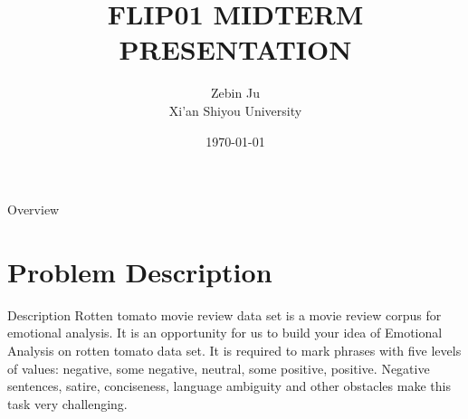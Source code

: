\documentclass[
 size=12pt,
 paper=smartboard, %
 mode=present, %
 display=slides, %
style=tuliplab,
pauseslide,
fleqn,leqno]{powerdot}
\title{FLIP01 MIDTERM PRESENTATION}
\author{
Zebin Ju
\\
Xi'an Shiyou University 
}
\date{\today}
\begin{document}
\maketitle 
\begin{slide}[toc=,bm=]{Overview}
  \tableofcontents[content=sections]
\end{slide}

  \section{Problem Description}

  \begin{slide}{Description}
 \hspace{0.5cm}  Rotten tomato movie review data set is a movie review corpus for emotional analysis. 
 It is an opportunity for us to build your idea of Emotional Analysis on rotten tomato data set. It is required to mark phrases with five levels of values: negative, some negative, neutral, some positive, positive. Negative sentences, satire, conciseness, language ambiguity and other obstacles make this task very challenging.
  \end{slide}
    \
\end{document}
